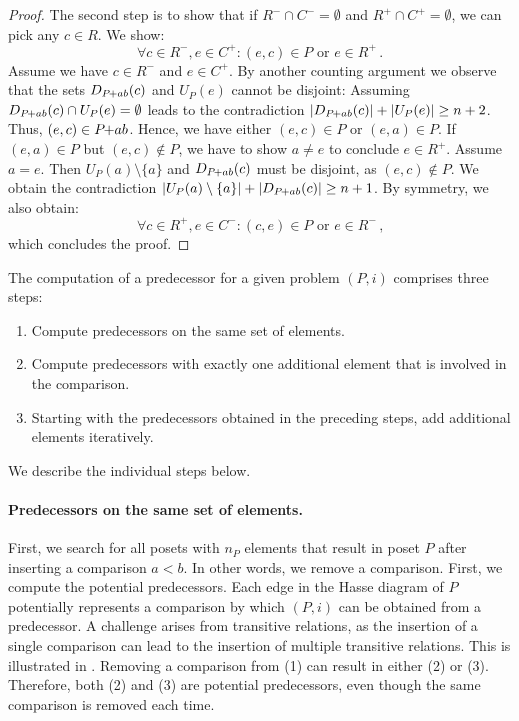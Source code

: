 \documentclass[twoside,leqno,twocolumn]{article}
\newcommand{\pchild}[3]{{#1}\kern-1pt{+}{#2}{#3}}
\newcommand{\less}[2]{D_{#1}(#2)}
\newcommand{\greater}[2]{U_{#1}(#2)}
\begin{document}
\begin{proof}
  The second step is to show that if $R^- \cap C^- = \emptyset$ and $R^+ \cap C^+ = \emptyset$, we can pick any $c \in R$.
  We show:
  \begin{equation}
    \forall c \in R^-, e \in C^+ \colon (e, c) \in P \text{ or } e \in R^+\,\text{.}
  \end{equation}
  Assume we have $c \in R^-$ and $e \in C^+$.
  By another counting argument we observe that the sets $\less{\pchild{P}{a}{b}}{c}$ and $\greater{P}{e}$ cannot be disjoint:
  Assuming $\less{\pchild{P}{a}{b}}{c} \cap \greater{P}{e} = \emptyset$ leads to the contradiction $|\less{\pchild{P}{a}{b}}{c}| + |\greater{P}{e}| \ge n + 2$.
  Thus, $(e, c) \in \pchild{P}{a}{b}$.
  Hence, we have either $(e, c) \in P$ or $(e, a) \in P$.
  If $(e, a) \in P$ but $(e, c) \notin P$, we have to show $a \neq e$ to conclude $e \in R^+$.
  Assume $a = e$.
  Then $\greater{P}{a} \setminus \{ a \}$ and $\less{\pchild{P}{a}{b}}{c}$ must be disjoint, as $(e, c) \notin P$.
  We obtain the contradiction $|\greater{P}{a} \setminus \{ a \}| + |\less{\pchild{P}{a}{b}}{c}| \ge n + 1$.
  By symmetry, we also obtain:
  \begin{equation}
    \forall c \in R^+, e \in C^- \colon (c, e) \in P \text{ or } e \in R^-\,\text{,}
  \end{equation}
  which concludes the proof.
\end{proof}

The computation of a predecessor for a given problem $(P, i)$ comprises three steps:
\begin{enumerate}
  \item Compute predecessors on the same set of elements.
  \item Compute predecessors with exactly one additional element that is involved in the comparison.
  \item Starting with the predecessors obtained in the preceding steps, add additional elements iteratively.
\end{enumerate}
We describe the individual steps below. %

\paragraph{Predecessors on the same set of elements.}
First, we search for all posets with $n_P$ elements that result in poset $P$ after inserting a comparison $a < b$.
In other words, we remove a comparison.
First, we compute the potential predecessors.
Each edge in the Hasse diagram of $P$ potentially represents a comparison by which $(P, i)$ can be obtained from a predecessor.
A challenge arises from transitive relations, as the insertion of a single comparison can lead to the insertion of multiple transitive relations.
This is illustrated in .
Removing a comparison from (1) can result in either (2) or (3).
Therefore, both (2) and (3) are potential predecessors, even though the same comparison is removed each time.
\end{document}
